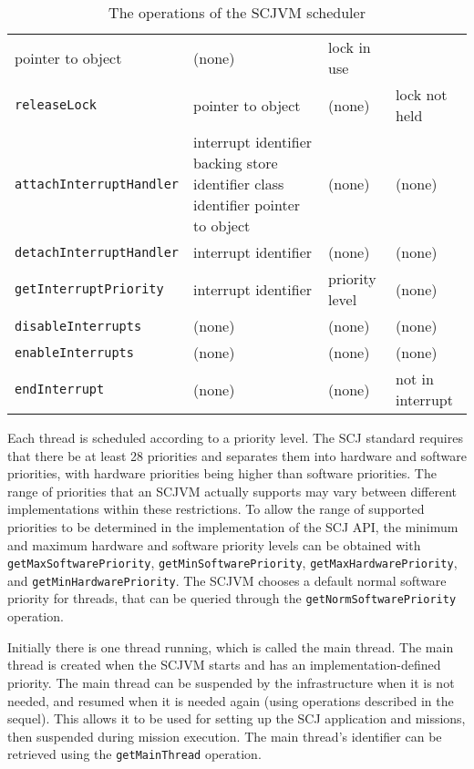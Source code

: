 \begin{table*}[ht]
\begin{tabular}{|l|p{3.2cm}|p{2.3cm}|p{3.6cm}|}
    pointer to object &
    (none) &
    lock in use
    \\\texttt{releaseLock} &
    pointer to object &
    (none) &
    lock not held
    \\\texttt{attachInterruptHandler} &
    interrupt identifier \newline
    backing store identifier \newline
    class identifier \newline
    pointer to object &
    (none) &
    (none)
    \\\texttt{detachInterruptHandler} &
    interrupt identifier &
    (none) &
    (none)
    \\\texttt{getInterruptPriority} &
    interrupt identifier &
    priority level &
    (none)
    \\\texttt{disableInterrupts} &
    (none) &
    (none) &
    (none)
    \\\texttt{enableInterrupts} &
    (none) &
    (none) &
    (none)
    \\\texttt{endInterrupt} &
    (none) &
    (none) &
    not in interrupt
  \end{tabular}
  \caption{The operations of the SCJVM scheduler}
  \label{scheduler-table}
\end{table*}

Each thread is scheduled according to a priority level.
The SCJ standard requires that there be at least 28 priorities and
separates them into hardware and software priorities, with hardware
priorities being higher than software priorities.
The range of priorities that an SCJVM actually supports may vary
between different implementations within these restrictions.
To allow the range of supported priorities to be determined in the
implementation of the SCJ API, the minimum and maximum hardware and
software priority levels can be obtained with
\texttt{getMaxSoftwarePriority},
\texttt{getMinSoftwarePriority},
\texttt{getMaxHardwarePriority}, and
\texttt{getMinHardwarePriority}.
The SCJVM chooses a default normal software priority for threads, that
can be queried through the \texttt{getNormSoftwarePriority}
operation.

Initially there is one thread running, which is called the main
thread.
The main thread is created when the SCJVM starts and has an
implementation-defined priority.
The main thread can be suspended by the infrastructure when it is not
needed, and resumed when it is needed again (using operations described
in the sequel).
This allows it to be used for setting up the SCJ application and
missions, then suspended during mission execution.
The main thread's identifier can be retrieved using the
\texttt{getMainThread} operation.

